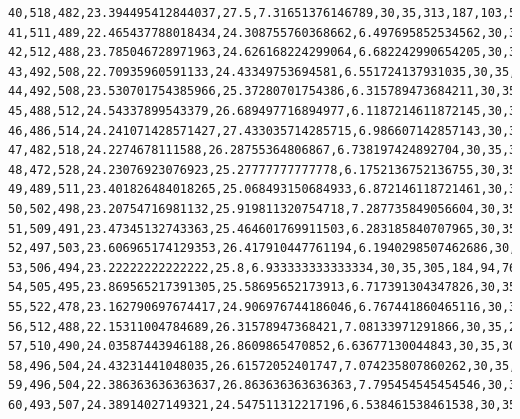 \documentclass[authoryearcitations]{UoYCSproject}
\begin{document}
\begin{landscape}
\begin{verbatim}
40,518,482,23.394495412844037,27.5,7.31651376146789,30,35,313,187,103,57,47,57,35,51,36,31,29,22,12,9,8,3,0,0,0
41,511,489,22.465437788018434,24.308755760368662,6.497695852534562,30,35,306,186,100,76,57,42,46,38,40,26,28,23,13,8,5,5,1,0,0
42,512,488,23.785046728971963,24.626168224299064,6.682242990654205,30,35,306,169,107,74,71,50,42,35,40,28,25,22,15,9,4,3,0,0,0
43,492,508,22.70935960591133,24.43349753694581,6.551724137931035,30,35,287,184,94,80,68,58,47,38,37,33,23,16,15,10,8,0,2,0,0
44,492,508,23.530701754385966,25.37280701754386,6.315789473684211,30,35,309,182,89,69,55,70,53,39,28,36,23,18,8,10,5,4,2,0,0
45,488,512,24.54337899543379,26.689497716894977,6.1187214611872145,30,35,305,193,90,52,65,53,66,42,42,21,28,13,15,6,5,3,1,0,0
46,486,514,24.241071428571427,27.433035714285715,6.986607142857143,30,35,319,172,98,56,45,57,43,61,41,33,26,12,15,11,4,4,3,0,0
47,482,518,24.2274678111588,26.28755364806867,6.738197424892704,30,35,324,191,89,49,51,45,49,44,50,35,20,20,11,11,6,2,3,0,0
48,472,528,24.23076923076923,25.27777777777778,6.1752136752136755,30,35,329,190,98,55,46,46,39,47,41,41,24,9,16,7,5,5,2,0,0
49,489,511,23.401826484018265,25.068493150684933,6.872146118721461,30,35,318,187,91,78,42,44,46,34,45,33,36,19,11,8,3,4,1,0,0
50,502,498,23.20754716981132,25.919811320754718,7.287735849056604,30,35,300,201,85,65,66,42,40,47,26,36,32,31,11,8,5,2,3,0,0
51,509,491,23.47345132743363,25.464601769911503,6.283185840707965,30,35,312,188,96,63,53,66,30,39,39,18,30,27,21,11,5,1,1,0,0
52,497,503,23.606965174129353,26.417910447761194,6.1940298507462686,30,35,288,183,122,54,49,57,59,32,37,30,18,22,22,17,7,2,1,0,0
53,506,494,23.22222222222222,25.8,6.933333333333334,30,35,305,184,94,76,51,50,48,53,31,29,21,12,18,14,11,3,0,0,0
54,505,495,23.869565217391305,25.58695652173913,6.717391304347826,30,35,325,162,106,67,65,50,36,50,35,32,24,14,7,17,6,4,0,0,0
55,522,478,23.162790697674417,24.906976744186046,6.767441860465116,30,35,314,171,89,78,67,53,44,34,50,28,28,13,11,9,6,5,0,0,0
56,512,488,22.15311004784689,26.31578947368421,7.08133971291866,30,35,297,184,94,61,74,61,52,35,31,40,28,14,11,4,7,6,1,0,0
57,510,490,24.03587443946188,26.8609865470852,6.63677130044843,30,35,305,193,82,69,36,75,59,39,33,31,29,19,10,9,4,5,1,1,0
58,496,504,24.43231441048035,26.61572052401747,7.074235807860262,30,35,315,191,86,72,45,40,64,55,32,28,25,21,9,10,3,1,3,0,0
59,496,504,22.386363636363637,26.863636363636363,7.795454545454546,30,35,311,183,110,52,63,47,30,59,47,25,23,18,17,6,4,2,2,1,0
60,493,507,24.38914027149321,24.547511312217196,6.538461538461538,30,35,309,189,88,84,51,61,42,31,48,29,24,15,11,7,6,2,0,3,0

\end{verbatim}
\end{landscape}
\end{document}
